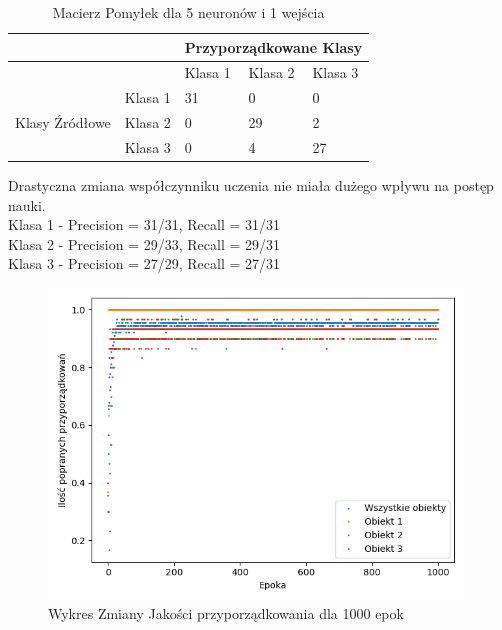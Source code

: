 \documentclass[12pt]{article}
\begin{document}
\begin{table}
\caption{\label{tab:tablica19} Macierz Pomyłek dla 5 neuronów  i 1 wejścia}
\begin{tabular}{ |p{3cm}|p{3cm}|p{2cm}|p{2cm}|p{2cm}|  }
 \hline
 & & 
 \multicolumn{3}{|c|}{Przyporządkowane Klasy} \\
 \hline

   & & Klasa 1 & Klasa 2 & Klasa 3\\
 \hline
\multirow{3}{4em}{Klasy Źródłowe}
   & Klasa 1 & 31 & 0 & 0 \\ 
   & Klasa 2 & 0  & 29 & 2 \\
   & Klasa 3 & 0  & 4  & 27 \\
 \hline
\end{tabular}
\end{table}
Drastyczna zmiana współczynniku uczenia nie miała dużego wpływu na postęp nauki.
\\Klasa 1 - Precision = 31/31, Recall = 31/31\\
Klasa 2 - Precision = 29/33, Recall = 29/31\\
Klasa 3 - Precision = 27/29, Recall = 27/31\\
\newpage

\begin{figure}[!ht]
 \centering
 \includegraphics[width=11cm]{Wykreswspuczenia.png}
 \caption{Wykres Zmiany Jakości przyporządkowania dla 1000 epok}
 \vspace{-0.1cm}
 \label{WykresPrzyp20}
\end{figure}

\newpage
\end{document}
